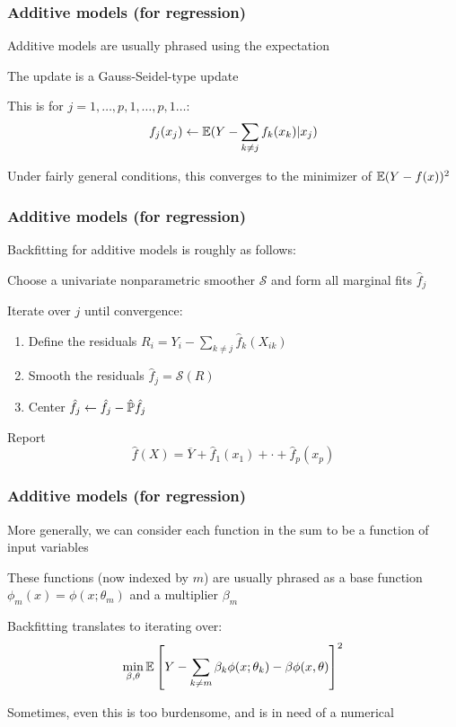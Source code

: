 \documentclass[12pt]{beamer}
\begin{document}
\begin{frame}[fragile]
\frametitle{Additive models (for regression)}
Additive models are usually phrased using the  expectation


\vsp
The update is a Gauss-Seidel-type update


\vsp
This is for $j=1,\ldots,p,1,\ldots,p,1\ldots$:
\[
f_j(x_j) \leftarrow \E(Y - \sum_{k\neq j} f_k(x_k)| x_j)
\]

\vsp
Under fairly general conditions, this converges to the minimizer of $\E(Y - f(x))^2$

\end{frame}

\begin{frame}[fragile]
\frametitle{Additive models (for regression)}
Backfitting for additive models is roughly as follows:

\vsp
Choose a univariate nonparametric smoother $\mathcal{S}$ and form all marginal fits $\hat{f}_j$


\vsp
Iterate over $j$ until convergence:
\begin{enumerate}
\item Define the residuals $R_i = Y_i - \sum_{k \neq j} \hat{f}_k(X_{ik})$
\item Smooth the residuals $\hat{f}_j = \mathcal{S}(R)$
\item Center $\hat{f}_j \leftarrow \hat{f}_j - \hat\P\hat{f}_j$
\end{enumerate}
Report
\[
\hat{f}(X) = \overline{Y} + \hat{f}_1(x_1)+\cdot+ \hat{f}_p(x_p)
\]
\end{frame}

\begin{frame}[fragile]
\frametitle{Additive models (for regression)}
More generally, we can consider each function in the sum to be a function of  input variables

\vsp
These functions (now indexed by $m$) are usually phrased as a base function
 $\phi_m(x) = \phi(x;\theta_m)$ and a multiplier $\beta_m$

\vsp

Backfitting translates to iterating over:
\[
\min_{\beta,\theta} \E\left[ Y - \sum_{k\neq m} \beta_k \phi(x;\theta_k) - \beta\phi(x,\theta)\right]^2
\]

\vsp
Sometimes, even this is too burdensome, and is in need of a numerical 
\end{frame}
\end{document}
